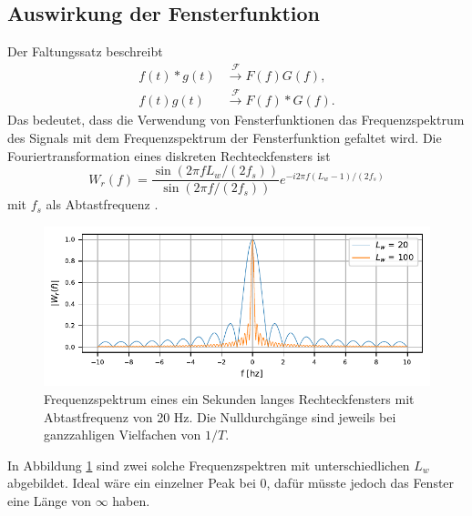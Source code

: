 \subsection{Auswirkung der Fensterfunktion}
Der Faltungssatz beschreibt 
\begin{align}
    f(t) * g(t)& \xrightarrow{\mathscr{F}} F(f)G(f),\\
    f(t) g(t)&\xrightarrow{\mathscr{F}}F(f) * G(f).
\end{align}
Das bedeutet, dass die Verwendung von Fensterfunktionen das Frequenzspektrum
des Signals mit dem Frequenzspektrum der Fensterfunktion gefaltet wird.
Die Fouriertransformation eines diskreten Rechteckfensters ist 
\begin{equation}
    W_r(f) = \frac{\sin(2 \pi f  L_w / (2 f_s))}{\sin(2 \pi f / (2 f_s))} e^{-i 2 \pi f (L_w-1)/(2f_s)}
\end{equation}
mit $f_s$ als Abtastfrequenz \cite{sonogramm:digsig}.
\begin{figure}
    \centering
    \includegraphics{papers/sonogramm/images/rect_freq.pdf}
    \caption{Frequenzspektrum eines ein Sekunden langes Rechteckfensters mit Abtastfrequenz von 20 Hz. Die Nulldurchgänge sind jeweils bei ganzzahligen Vielfachen
    von $1/T$.
    \label{sonogramm:rectfreq}
    }
\end{figure}
In Abbildung \ref{sonogramm:rectfreq} sind zwei solche Frequenzspektren mit unterschiedlichen $L_w$ abgebildet.
Ideal wäre ein einzelner Peak bei 0, dafür müsste jedoch das Fenster eine Länge von $\infty$ haben.

